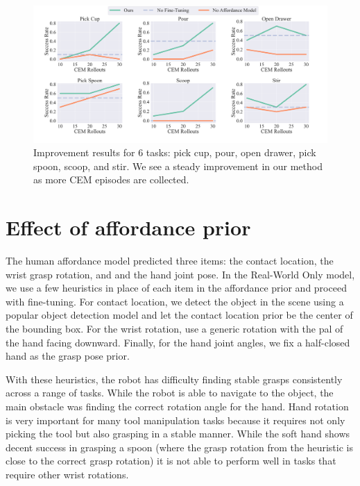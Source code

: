 \begin{figure}[t]
\centering
\includegraphics[width=\linewidth]{figs/graphs_main.pdf}
\vspace{-0.25in}
  \caption{\small Improvement results for 6 tasks: pick cup, pour, open drawer, pick spoon, scoop, and stir. We see a steady improvement in our method as more CEM episodes are collected.
}
 \label{fig:graph_main}
 \vspace{0.1in}
\end{figure}


\section{Effect of affordance prior} 
The human affordance model predicted three items: the contact location, the wrist grasp rotation, and and the hand joint pose. In the Real-World Only model, we use a few heuristics in place of each item in the affordance prior and proceed with fine-tuning. For contact location, we detect the object in the scene using a popular object detection model \cite{kirillov2023segment} and let the contact location prior be the center of the bounding box. For the wrist rotation, use a generic rotation with the pal of the hand facing downward. Finally, for the hand joint angles, we fix a half-closed hand as the grasp pose prior.  

With these heuristics, the robot has difficulty finding stable grasps consistently across a range of tasks. While the robot is able to navigate to the object, the main obstacle was finding the correct rotation angle for the hand. Hand rotation is very important for many tool manipulation tasks because it requires not only picking the tool but also grasping in a stable manner. While the soft hand shows decent success in grasping a spoon (where the grasp rotation from the heuristic is close to the correct grasp rotation) it is not able to perform well in tasks that require other wrist rotations.

